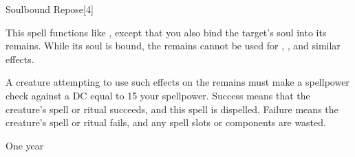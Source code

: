 \begin{spellsection}{Soulbound Repose}[4]
    \begin{spellheader}
    \end{spellheader}
    \begin{spellcontent}
        \begin{spelltargetinginfo}
        \end{spelltargetinginfo}
        \begin{spelleffects}
            \spelleffect This spell functions like , except that you also bind the target's soul into its remains. While its soul is bound, the remains cannot be used for , , and similar effects.

            A creature attempting to use such effects on the remains must make a spellpower check against a DC equal to 15 \add your spellpower. Success means that the creature's spell or ritual succeeds, and this spell is dispelled. Failure means the creature's spell or ritual fails, and any spell slots or components are wasted.

            \spelldur One year \dismissable
        \end{spelleffects}
    \end{spellcontent}
    \begin{spellfooter}
    \end{spellfooter}
\end{spellsection}

